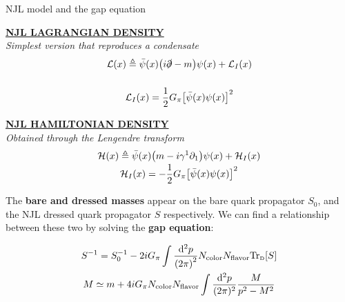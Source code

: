 \documentclass[9pt, handout, aspectratio=169]{beamer}	%
\begin{document}
\begin{frame}{NJL model and the gap equation}

	\begin{multicols}{2}

		\begin{center}
			\underline{\textbf{NJL LAGRANGIAN DENSITY}}\\
			\small{\emph{Simplest version that reproduces a condensate}}
			\begin{gather*}
				\vspace{0.4em}
				\mathcal{L}(x) \defeq
			    \bar{\psi}(x) \qty(i\slashed{\partial}-m) \psi(x) + \mathcal{L}_{I}(x)
					\\[10pt]
				\mathcal{L}_{I}(x) =
			    \frac{1}{2} G_{\pi} \qty[\bar{\psi}(x)\psi(x)]^2
			\end{gather*}
		\end{center}

		\columnbreak

		\begin{center}
			\underline{\textbf{NJL HAMILTONIAN DENSITY}}\\
			\small{\emph{Obtained through the Lengendre transform}}
			\begin{gather*}
				\vspace{-1em}
			  \mathcal{H}(x) \defeq
			    \bar{\psi}(x)\qty(m - i\gamma^{1}\partial_{1})\psi(x) + \mathcal{H}_{I}(x) \\[8pt]
				\mathcal{H}_{I}(x) =
		    	- \frac{1}{2} G_{\pi} \qty[\bar{\psi}(x)\psi(x)]^{2}
			\end{gather*}
		\end{center}

	\end{multicols}

	\vspace{1em}

	The \textbf{bare and dressed masses} appear on the bare quark propagator $S_{0}$, and the NJL dressed quark propagator $S$ respectively. We can find a relationship between these two by solving the \textbf{gap equation}:

	\begin{gather*}
		S^{-1} =
			S_{0}^{-1} - 2iG_{\pi} \int \frac{\dd[2]{p}}{\qty(2\pi)^{2}}
			N_\text{color} N_\text{flavor} \text{Tr}_\text{\tiny{D}}\qty[S] \\
	  M \simeq
	    m + 4iG_\pi N_\text{color} N_\text{flavor}
	    \int \frac{\dd[2]{p}}{(2\pi)^2} \frac{M}{p^2 - M^2}
	\end{gather*}

\end{frame}
\end{document}
